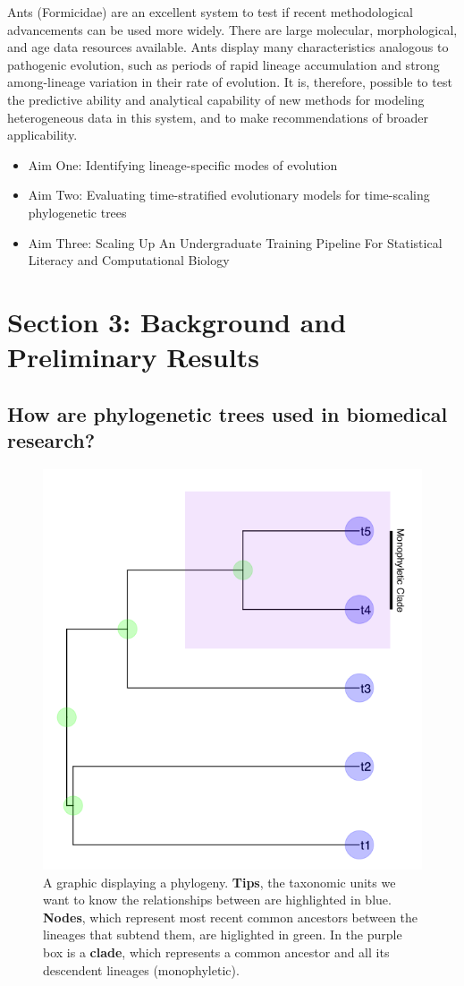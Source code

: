 \documentclass[]{article}
\begin{document}
Ants (Formicidae) are an excellent system to test if  recent methodological advancements can be used more widely. 
There are large molecular, morphological, and age data resources available. 
Ants display many characteristics analogous to pathogenic evolution, such as periods of rapid lineage accumulation and strong among-lineage variation in their rate of evolution.
It is, therefore, possible to test the predictive ability and analytical capability of new methods for modeling heterogeneous data in this system, and to make recommendations of broader applicability. 

\begin{itemize}
	\item Aim One: Identifying lineage-specific modes of evolution
	\item Aim Two: Evaluating time-stratified evolutionary models for time-scaling phylogenetic trees
	\item Aim Three: Scaling Up An Undergraduate Training Pipeline For Statistical Literacy and Computational Biology

\end{itemize}
\pagebreak

\section*{Section 3: Background and Preliminary Results}
\subsection*{How are phylogenetic trees used in biomedical research?}

\begin{figure}
	
    \includegraphics[width=.5\textwidth]{fig/Fig1.png}
       \caption{A graphic displaying a phylogeny. \textbf{Tips}, the taxonomic units we want to know the relationships between are highlighted in blue. \textbf{Nodes}, which represent most recent common ancestors between the lineages that subtend them, are higlighted in green. In the purple box is a \textbf{clade}, which represents a common ancestor and all its descendent lineages (monophyletic).}
\end{figure}
\end{document}
